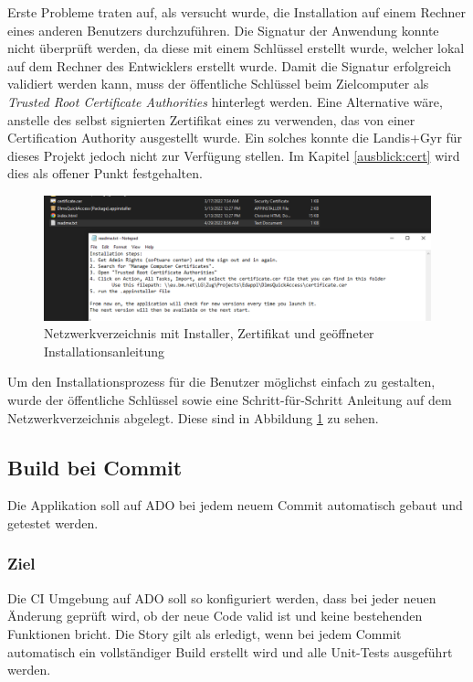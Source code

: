 Erste Probleme traten auf, als versucht wurde, die Installation auf einem Rechner eines anderen Benutzers durchzuführen.
Die Signatur der Anwendung konnte nicht überprüft werden, da diese mit einem Schlüssel erstellt wurde, welcher lokal auf dem Rechner des Entwicklers erstellt wurde.
Damit die Signatur erfolgreich validiert werden kann, muss der öffentliche Schlüssel beim Zielcomputer als \textit{Trusted Root Certificate Authorities} hinterlegt werden.
Eine Alternative wäre, anstelle des selbst signierten Zertifikat eines zu verwenden, das von einer Certification Authority ausgestellt wurde.
Ein solches konnte die Landis+Gyr für dieses Projekt jedoch nicht zur Verfügung stellen.
Im Kapitel \ref{ausblick:cert} wird dies als offener Punkt festgehalten.

\begin{figure}
   \centering
   \includegraphics[width=1.0\textwidth]{gfx/installer_readme.png}
   \caption{
      Netzwerkverzeichnis mit Installer, Zertifikat und geöffneter Installationsanleitung
      }
      \label{fig:installerreadme}
\end{figure}

Um den Installationsprozess für die Benutzer möglichst einfach zu gestalten, wurde der öffentliche Schlüssel sowie eine Schritt-für-Schritt Anleitung auf dem Netzwerkverzeichnis abgelegt.
Diese sind in Abbildung \ref{fig:installerreadme} zu sehen.


\subsection{Build bei Commit}\label{story_buildoncommit}
\dq Die Applikation soll auf \ac{ADO} bei jedem neuem Commit automatisch gebaut und getestet werden.\dq

\subsubsection{Ziel}
Die \ac{CI} Umgebung auf \ac{ADO} soll so konfiguriert werden, dass bei jeder neuen Änderung geprüft wird, ob der neue Code valid ist und keine bestehenden Funktionen bricht.
Die Story gilt als erledigt, wenn bei jedem Commit automatisch ein vollständiger Build erstellt wird und alle Unit-Tests ausgeführt werden.

